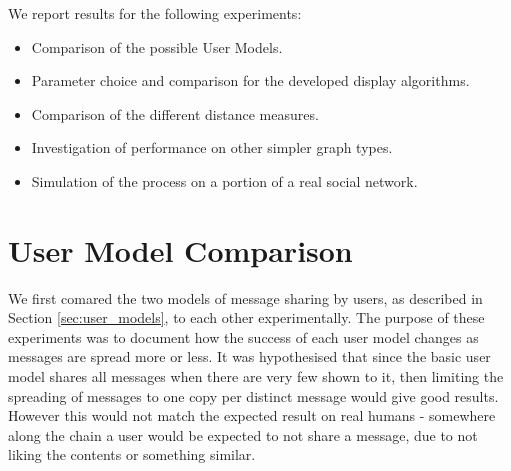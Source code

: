\documentclass[bsc,frontabs,twoside,singlespacing,parskip,deptreport]{infthesis}     %
\begin{document}
We report results for the following experiments:
\begin{itemize}
\item Comparison of the possible User Models.
\item Parameter choice and comparison for the developed display algorithms.
\item Comparison of the different distance measures.
\item Investigation of performance on other simpler graph types.
\item Simulation of the process on a portion of a real social network.
\end{itemize}

\section{User Model Comparison} \label{sec:user_model_comparison}
We first comared the two models of message sharing by users, as described in Section \ref{sec:user_models}, to each other experimentally. The purpose of these experiments was to document how the success of each user model changes as messages are spread more or less. It was hypothesised that since the basic user model shares all messages when there are very few shown to it, then limiting the spreading of messages to one copy per distinct message would give good results. However this would not match the expected result on real humans - somewhere along the chain a user would be expected to not share a message, due to not liking the contents or something similar.
\end{document}
